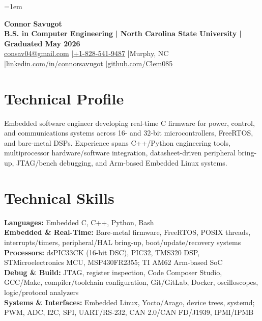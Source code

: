 \documentclass[10pt,letterpaper]{article}
\begin{document}
\fontsize{9.65}{10.50}\selectfont
\setlength{\RaggedRightRightskip}{0pt plus 5em}
\RaggedRight
\emergencystretch=1em

\begin{center}
  {\fontsize{21.5}{22.2}\selectfont\bfseries Connor Savugot}\\[1.5pt]
  {\bfseries B.S. in Computer Engineering | North Carolina State University | Graduated May 2026}\\[1.5pt]
  {\fontsize{9.6}{10.2}\selectfont
    \href{mailto:consav04@gmail.com}{consav04@gmail.com}
    \enspace|\enspace \href{tel:+18285419487}{+1-828-541-9487}
    \enspace|\enspace Murphy, NC
    \enspace|\enspace \href{https://linkedin.com/in/connorsavugot}{linkedin.com/in/connorsavugot}
    \enspace|\enspace \href{https://github.com/Clem085}{github.com/Clem085}}
\end{center}
\vspace{-0.18cm}

\section{Technical Profile}
Embedded software engineer developing real-time C firmware for power, control, and communications systems across 16- and 32-bit microcontrollers, FreeRTOS, and bare-metal DSPs. Experience spans C++/Python engineering tools, multiprocessor hardware/software integration, datasheet-driven peripheral bring-up, JTAG/bench debugging, and Arm-based Embedded Linux systems.

\section{Technical Skills}
\textbf{Languages:} Embedded C, C++, Python, Bash\\
\textbf{Embedded \& Real-Time:} Bare-metal firmware, FreeRTOS, POSIX threads, interrupts/timers, peripheral/HAL bring-up, boot/update/recovery systems\\
\textbf{Processors:} dsPIC33CK (16-bit DSC), PIC32, TMS320 DSP, STMicroelectronics MCU, MSP430FR2355; TI AM62 Arm-based SoC\\
\textbf{Debug \& Build:} JTAG, register inspection, Code Composer Studio, GCC/Make, compiler/toolchain configuration, Git/GitLab, Docker, oscilloscopes, logic/protocol analyzers\\
\textbf{Systems \& Interfaces:} Embedded Linux, Yocto/Arago, device trees, systemd; PWM, ADC, I2C, SPI, UART/RS-232, CAN 2.0/CAN FD/J1939, IPMI/IPMB
\end{document}

